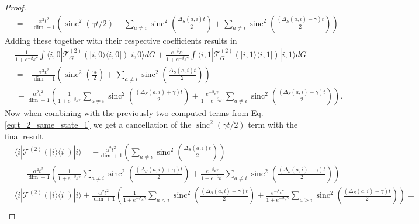 \documentclass{article}
\newcommand{\ket}[1]{|#1\rangle}
\newcommand{\bra}[1]{\langle #1|}
\newcommand{\ketbra}[2]{| #1\rangle\! \langle #2|}
\newcommand{\parens}[1]{\left( #1 \right)}
\DeclareMathOperator{\sinc}{sinc}
\begin{document}
\begin{proof}
\begin{align}
        &=- \frac{\alpha^2 t^2}{\dim  + 1} \parens{\sinc^2 (\gamma t / 2) + \sum_{a \neq i} \sinc^2 \left( \frac{\Delta_S(a, i) t}{2} \right) + \sum_{a \neq i} \sinc^2\parens{\frac{(\Delta_S(a, i) - \gamma)t}{2}} }
    \end{align}
    Adding these together with their respective coefficients results in
    \begin{align}
        &\frac{1}{1 + e^{-\beta_E \gamma}} \int \bra{i, 0} \mathcal{T}^{(2)}_G (\ketbra{i, 0}{i, 0}) \ket{i, 0} dG + \frac{e^{-\beta_E \gamma}}{1 + e^{-\beta_E \gamma}} \int \bra{i, 1} \mathcal{T}^{(2)}_G (\ketbra{i, 1}{i, 1}) \ket{i, 1} dG \\
        &= - \frac{\alpha^2 t^2}{\dim + 1} \left( \sinc^2\parens{\frac{\gamma t}{2}} + \sum_{a \neq i} \sinc^2\parens{\frac{\Delta_S(a,i)t}{2}} \right) \nonumber \\
        &~ - \frac{\alpha^2 t^2}{\dim + 1} \left( \frac{1}{1 + e^{-\beta_E \gamma}}\sum_{a \neq i} \sinc^2\parens{\frac{(\Delta_S(a, i) +\gamma)t}{2}}  + \frac{e^{-\beta_E \gamma}}{1 + e^{-\beta_E \gamma}}\sum_{a \neq i} \sinc^2\parens{\frac{(\Delta_S(a, i) -\gamma)t}{2}} \right).
    \end{align}
    Now when combining with the previously two computed terms from Eq. \eqref{eq:t_2_same_state_1} we get a cancellation of the $\sinc^2(\gamma t/ 2)$ term with the final result
    \begin{align}
        &\bra{i} \mathcal{T}^{(2)}(\ketbra{i}{i})\ket{i} = - \frac{\alpha^2 t^2}{\dim + 1} \left(\sum_{a \neq i} \sinc^2\parens{\frac{\Delta_S(a,i)t}{2}}  \right) \nonumber \\
        &~ - \frac{\alpha^2 t^2}{\dim + 1} \left( \frac{1}{1 + e^{-\beta_E \gamma}}\sum_{a \neq i} \sinc^2\parens{\frac{(\Delta_S(a, i) +\gamma)t}{2}}  + \frac{e^{-\beta_E \gamma}}{1 + e^{-\beta_E \gamma}}\sum_{a \neq i} \sinc^2\parens{\frac{(\Delta_S(a, i) -\gamma)t}{2}} \right) \\
        &\bra{i} \mathcal{T}^{(2)}(\ketbra{i}{i})\ket{i} + \frac{\alpha^2 t^2}{\dim + 1} \left( \frac{1}{1 + e^{-\beta_E \gamma}}\sum_{a < i} \sinc^2\parens{\frac{(\Delta_S(a, i) +\gamma)t}{2}}  + \frac{e^{-\beta_E \gamma}}{1 + e^{-\beta_E \gamma}}\sum_{a > i} \sinc^2\parens{\frac{(\Delta_S(a, i) -\gamma)t}{2}} \right) = \nonumber \\

\end{align}
\end{proof}
\end{document}
